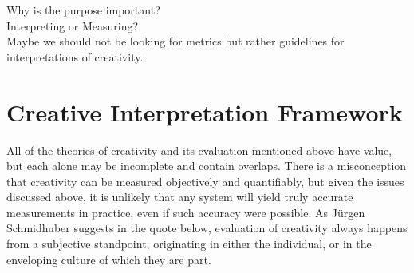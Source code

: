 
\begin{fcom}
  Why is the purpose important?\\
  Interpreting or Measuring?\\
  Maybe we should not be looking for metrics but rather guidelines for interpretations of creativity.
\end{fcom}

%
%
%






\section{Creative Interpretation Framework}
\label{s:framework}

All of the theories of creativity and its evaluation mentioned above have value, but each alone may be incomplete and contain overlaps. There is a misconception that creativity can be measured objectively and quantifiably, but given the issues discussed above, it is unlikely that any system will yield truly accurate measurements in practice, even if such accuracy were possible. As J{\"u}rgen Schmidhuber suggests in the quote below, evaluation of creativity always happens from a subjective standpoint, originating in either the individual, or in the enveloping culture of which they are part.

